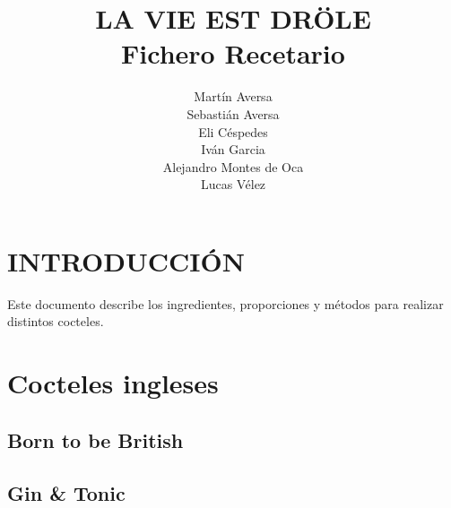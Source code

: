 \documentclass[a4paper]{spie}  %
\title{\uppercase{ {\fontsize{120}{120}\selectfont La vie est dr\"{o}le}} \\ 
\bigskip \bigskip \bigskip \bigskip
{\fontsize{40}{40}\selectfont Fichero Recetario}}
\author{Mart\'in Aversa \\
Sebasti\'an Aversa \\
Eli C\'espedes \\
Iv\'an Garcia \\
Alejandro Montes de Oca \\
Lucas V\'elez
\skiplinehalf}
\begin{document}
 
  \maketitle 

\section{INTRODUCCI\'ON}
\label{sec:intro}  %

Este documento describe los ingredientes, proporciones y m\'etodos para realizar distintos cocteles.
\bigskip
\bigskip
\tableofcontents

\newpage
\section{Cocteles ingleses}
\bigskip \bigskip \bigskip
\subsection{Born to be British}

\newpage

\newpage
\bigskip \bigskip \bigskip
\subsection{Gin \& Tonic}

\newpage
\end{document}

